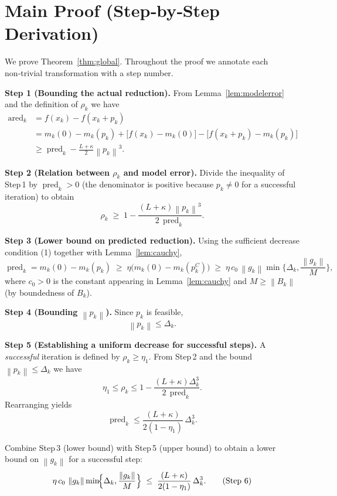 \documentclass{article}
\newcommand{\norm}[1]{\left\lVert #1\right\rVert}
\begin{document}
\section*{Main Proof (Step‑by‑Step Derivation)}
We prove Theorem~\ref{thm:global}.  Throughout the proof we annotate each non‑trivial transformation with a step number.

\medskip
\noindent\textbf{Step 1 (Bounding the actual reduction).}  
From Lemma~\ref{lem:modelerror} and the definition of $\rho_{k}$ we have
\[
\begin{aligned}
\operatorname{ared}_{k}
&= f(x_{k})-f(x_{k}+p_{k})\\
&= m_{k}(0)-m_{k}(p_{k}) +\bigl[f(x_{k})-m_{k}(0)\bigr]
          -\bigl[f(x_{k}+p_{k})-m_{k}(p_{k})\bigr]\\
&\ge \operatorname{pred}_{k} -\frac{L+\kappa}{2}\norm{p_{k}}^{3} .
\end{aligned}
\tag{Step 1}
\]

\noindent\textbf{Step 2 (Relation between $\rho_{k}$ and model error).}  
Divide the inequality of Step 1 by $\operatorname{pred}_{k}>0$ (the denominator is positive because $p_{k}\neq0$ for a successful iteration) to obtain
\[
\rho_{k}
\;\ge\; 1-\frac{(L+\kappa)\norm{p_{k}}^{3}}{2\,\operatorname{pred}_{k}} .
\tag{Step 2}
\]

\noindent\textbf{Step 3 (Lower bound on predicted reduction).}  
Using the sufficient decrease condition (1) together with Lemma~\ref{lem:cauchy},
\[
\operatorname{pred}_{k}
= m_{k}(0)-m_{k}(p_{k})
\;\ge\;\eta\bigl(m_{k}(0)-m_{k}(p_{k}^{C})\bigr)
\;\ge\; \eta\,c_{0}\,\norm{g_{k}}\min\{\Delta_{k},\frac{\norm{g_{k}}}{M}\},
\tag{Step 3}
\]
where $c_{0}>0$ is the constant appearing in Lemma~\ref{lem:cauchy} and $M\ge \norm{B_{k}}$ (by boundedness of $B_{k}$).

\noindent\textbf{Step 4 (Bounding $\norm{p_{k}}$).}  
Since $p_{k}$ is feasible,
\[
\norm{p_{k}}\le\Delta_{k}.
\tag{Step 4}
\]

\noindent\textbf{Step 5 (Establishing a uniform decrease for successful steps).}  
A \emph{successful} iteration is defined by $\rho_{k}\ge\eta_{1}$.  
From Step 2 and the bound $\norm{p_{k}}\le\Delta_{k}$ we have
\[
\eta_{1}\le \rho_{k}
\le 1-\frac{(L+\kappa)\Delta_{k}^{3}}{2\,\operatorname{pred}_{k}} .
\]
Rearranging yields
\[
\operatorname{pred}_{k}\le \frac{(L+\kappa)}{2(1-\eta_{1})}\,\Delta_{k}^{3}.
\tag{Step 5}
\]

Combine Step 3 (lower bound) with Step 5 (upper bound) to obtain a lower bound on $\norm{g_{k}}$ for a successful step:
\[
\eta\,c_{0}\,\norm{g_{k}}\min\!\Bigl\{\Delta_{k},\frac{\norm{g_{k}}}{M}\Bigr\}
\;\le\; \frac{(L+\kappa)}{2(1-\eta_{1})}\,\Delta_{k}^{3}.
\tag{Step 6}
\]
\end{document}
